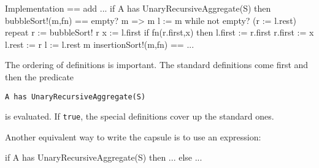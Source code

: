 \begin{xmpLines}
Implementation == add
        ...
    if A has UnaryRecursiveAggregate(S) then
      bubbleSort!(m,fn) ==
        empty? m => m
        l := m
        while not empty? (r := l.rest) repeat
           r := bubbleSort! r
           x := l.first
           if fn(r.first,x) then
             l.first := r.first
             r.first := x
           l.rest := r
           l := l.rest
         m
       insertionSort!(m,fn) ==
          ...
\end{xmpLines}

The ordering of definitions is important.
The standard definitions come first and
then the predicate
\begin{verbatim}
A has UnaryRecursiveAggregate(S)
\end{verbatim}
is evaluated.
If {\tt true}, the special definitions cover up the standard ones.

Another equivalent way to write the capsule is to use an
 expression:

\begin{xmpLines}
     if A has UnaryRecursiveAggregate(S) then
        ...
     else
        ...
\end{xmpLines}

